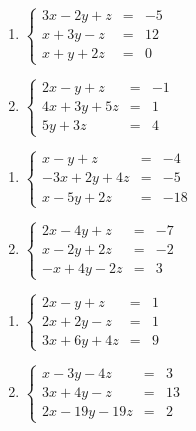 \begin{multicols}{2}
\begin{enumerate}
\setcounter{enumi}{\value{HW}}


\item $\left\{ \begin{array}{rcr} 3x-2y+z & = & -5 \\ x+3y-z & = & 12 \\ x+y+2z & = & 0  \end{array} \right.$
\item $\left\{ \begin{array}{rcr} 2x-y+z& = & -1 \\ 4x+3y+5z & = & 1 \\  5y+3z & = & 4 \end{array} \right.$

\setcounter{HW}{\value{enumi}}
\end{enumerate}
\end{multicols}


\begin{multicols}{2}
\begin{enumerate}
\setcounter{enumi}{\value{HW}}


\item $\left\{ \begin{array}{rcr} x-y+z & = & -4 \\ -3x+2y+4z & = & -5 \\ x-5y+2z & = & -18  \end{array} \right.$
\item $\left\{ \begin{array}{rcr} 2x-4y+z & = & -7 \\ x-2y+2z & = & -2 \\ -x+4y-2z & = & 3  \end{array} \right.$

\setcounter{HW}{\value{enumi}}
\end{enumerate}
\end{multicols}


\begin{multicols}{2}
\begin{enumerate}
\setcounter{enumi}{\value{HW}}


\item $\left\{ \begin{array}{rcr} 2x-y+z & = & 1 \\ 2x+2y-z & = & 1 \\ 3x+6y+4z & = & 9  \end{array} \right.$
\item $\left\{ \begin{array}{rcr} x-3y-4z & = & 3 \\ 3x+4y-z & = & 13 \\ 2x-19y-19z & = & 2  \end{array} \right.$

\setcounter{HW}{\value{enumi}}
\end{enumerate}
\end{multicols}


